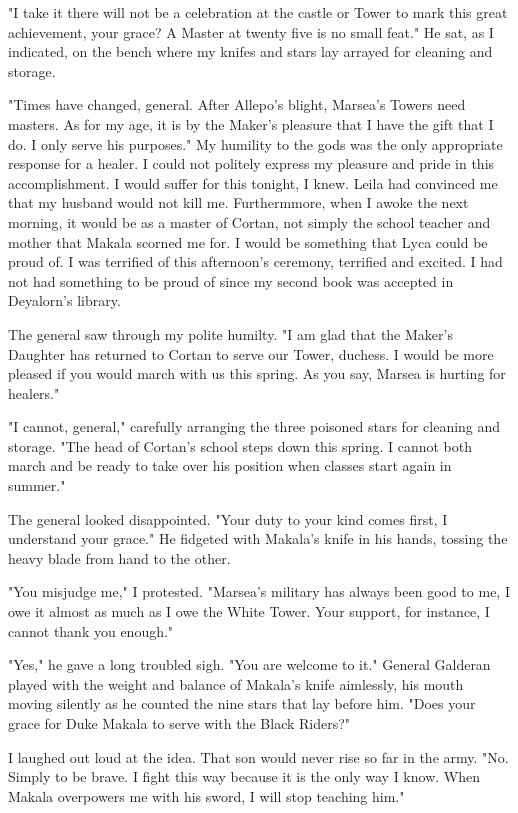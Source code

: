 \documentclass{article}
\begin{document}
"I take it there will not be a celebration at the castle or Tower to mark this great achievement, your grace? A Master at twenty five is no small feat." He sat, as I indicated, on the bench where my knifes and stars lay arrayed for cleaning and storage. 

"Times have changed, general. After Allepo's blight, Marsea's Towers need masters. As for my age, it is by the Maker's pleasure that I have the gift that I do. I only serve his purposes." My humility to the gods was the only appropriate response for a healer. I could not politely express my pleasure and pride in this accomplishment. I would suffer for this tonight, I knew. Leila had convinced me that my husband would not kill me. Furthermmore, when I awoke the next morning, it would be as a master of Cortan, not simply the school teacher and mother that Makala scorned me for. I would be something that Lyca could be proud of. I was terrified of this afternoon's ceremony, terrified and excited. I had not had something to be proud of since my second book was accepted in Deyalorn's library. 

The general saw through my polite humilty. "I am glad that the Maker's Daughter has returned to Cortan to serve our Tower, duchess. I would be more pleased if you would march with us this spring. As you say, Marsea is hurting for healers."

"I cannot, general," carefully arranging the three poisoned stars for cleaning and storage. "The head of Cortan's school steps down this spring. I cannot both march and be ready to take over his position when classes start again in summer."

The general looked disappointed. "Your duty to your kind comes first, I understand your grace." He fidgeted with Makala's knife in his hands, tossing the heavy blade from hand to the other. 

"You misjudge me," I protested. "Marsea's military has always been good to me, I owe it almost as much as I owe the White Tower. Your support, for instance, I cannot thank you enough."

"Yes," he gave a long troubled sigh. "You are welcome to it." General Galderan played with the weight and balance of Makala's knife aimlessly, his mouth moving silently as he counted the nine stars that lay before him. "Does your grace for Duke Makala to serve with the Black Riders?"

I laughed out loud at the idea. That son would never rise so far in the army. "No. Simply to be brave. I fight this way because it is the only way I know. When Makala overpowers me with his sword, I will stop teaching him."
\end{document}
